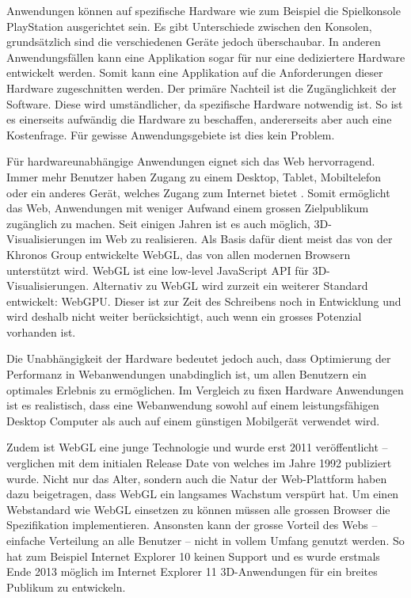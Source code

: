 Anwendungen können auf spezifische Hardware wie zum Beispiel die Spielkonsole PlayStation ausgerichtet sein. Es gibt Unterschiede zwischen den Konsolen, grundsätzlich sind die verschiedenen Geräte jedoch überschaubar. In anderen Anwendungsfällen kann eine Applikation sogar für nur eine dediziertere Hardware entwickelt werden. Somit kann eine Applikation auf die Anforderungen dieser Hardware zugeschnitten werden. Der primäre Nachteil ist die Zugänglichkeit der Software. Diese wird umständlicher, da spezifische Hardware notwendig ist. So ist es einerseits aufwändig die Hardware zu beschaffen, andererseits aber auch eine Kostenfrage. Für gewisse Anwendungsgebiete ist dies kein Problem.

Für hardwareunabhängige Anwendungen eignet sich das Web hervorragend.
Immer mehr Benutzer haben Zugang zu einem Desktop, Tablet, Mobiltelefon oder ein anderes Gerät, welches Zugang zum Internet bietet \cite{peopleWithInternetAccess}.
Somit ermöglicht das Web, Anwendungen mit weniger Aufwand einem grossen Zielpublikum zugänglich zu machen.
Seit einigen Jahren ist es auch möglich, 3D-Visualisierungen im Web zu realisieren.
Als Basis dafür dient meist das von der Khronos Group entwickelte WebGL, das von allen modernen Browsern unterstützt wird. WebGL ist eine low-level JavaScript API für 3D-Visualisierungen. \cite{webGl1Spec}
Alternativ zu WebGL wird zurzeit ein weiterer Standard entwickelt: WebGPU. Dieser ist zur Zeit des Schreibens noch in Entwicklung und wird deshalb nicht weiter berücksichtigt, auch wenn ein grosses Potenzial vorhanden ist. \cite{webGPUCharter}

Die Unabhängigkeit der Hardware bedeutet jedoch auch, dass Optimierung der Performanz in Webanwendungen unabdinglich ist, um allen Benutzern ein optimales Erlebnis zu ermöglichen.
Im Vergleich zu fixen Hardware Anwendungen ist es realistisch, dass eine Webanwendung sowohl auf einem leistungsfähigen Desktop Computer als auch auf einem günstigen Mobilgerät verwendet wird.

Zudem ist WebGL eine junge Technologie und wurde erst 2011 veröffentlicht – verglichen mit dem initialen Release Date von  welches im Jahre 1992 publiziert wurde. \cite{webGl1Spec,openGlSpec}
Nicht nur das Alter, sondern auch die Natur der Web-Plattform haben dazu beigetragen, dass WebGL ein langsames Wachstum verspürt hat. Um einen Webstandard wie WebGL einsetzen zu können müssen alle grossen Browser die Spezifikation implementieren. Ansonsten kann der grosse Vorteil des Webs – einfache Verteilung an alle Benutzer – nicht in vollem Umfang genutzt werden. So hat zum Beispiel Internet Explorer 10 keinen Support und es wurde erstmals Ende 2013 möglich im Internet Explorer 11 3D-Anwendungen für ein breites Publikum zu entwickeln.

